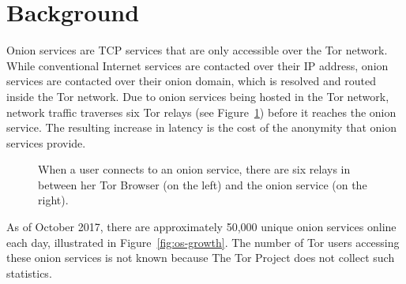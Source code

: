 \section{Background}
\label{sec:background}

Onion services are TCP services that are only accessible over the Tor network.
While conventional Internet services are contacted over their IP address, onion
services are contacted over their onion domain, which is resolved and routed
inside the Tor network.  Due to onion services being hosted in the Tor network,
network traffic traverses six Tor relays (see Figure~\ref{fig:onion-service})
before it reaches the onion service.  The resulting increase in latency is the
cost of the anonymity that onion services provide.

\begin{figure}[ht]
\centering
{}
\caption{When a user connects to an onion service, there are six relays in
between her Tor Browser (on the left) and the onion service (on the right).}
\label{fig:onion-service}
\end{figure}

As of October 2017, there are approximately 50,000 unique onion services online
each day, illustrated in Figure~\ref{fig:os-growth}.  The number of Tor users
accessing these onion services is not known because The Tor Project does not
collect such statistics.


